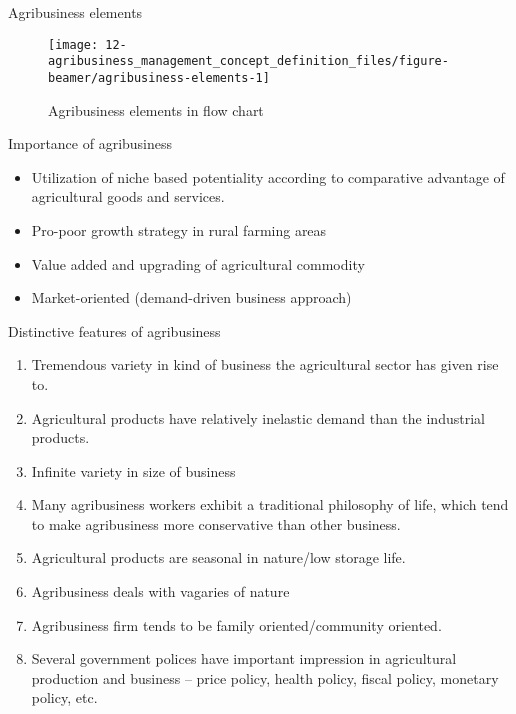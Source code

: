 \documentclass[12pt,ignorenonframetext,aspectratio=169]{beamer}
\providecommand{\tightlist}{%
  \setlength{\itemsep}{0pt}\setlength{\parskip}{0pt}}
\begin{document}
\begin{frame}{Agribusiness elements}
\protect\hypertarget{agribusiness-elements}{}
\begin{figure}
\texttt{[image: 12-agribusiness\_management\_concept\_definition\_files/figure-beamer/agribusiness-elements-1]} \caption{Agribusiness elements in flow chart}\label{fig:agribusiness-elements}
\end{figure}
\end{frame}

\begin{frame}{Importance of agribusiness}
\protect\hypertarget{importance-of-agribusiness}{}
\begin{itemize}
\tightlist
\item
  Utilization of niche based potentiality according to comparative
  advantage of agricultural goods and services.
\item
  Pro-poor growth strategy in rural farming areas
\item
  Value added and upgrading of agricultural commodity
\item
  Market-oriented (demand-driven business approach)
\end{itemize}
\end{frame}

\begin{frame}{Distinctive features of agribusiness}
\protect\hypertarget{distinctive-features-of-agribusiness}{}
\begin{enumerate}
\tightlist
\item
  Tremendous variety in kind of business the agricultural sector has
  given rise to.
\item
  Agricultural products have relatively inelastic demand than the
  industrial products.
\item
  Infinite variety in size of business
\item
  Many agribusiness workers exhibit a traditional philosophy of life,
  which tend to make agribusiness more conservative than other business.
\item
  Agricultural products are seasonal in nature/low storage life.
\item
  Agribusiness deals with vagaries of nature
\item
  Agribusiness firm tends to be family oriented/community oriented.
\item
  Several government polices have important impression in agricultural
  production and business -- price policy, health policy, fiscal policy,
  monetary policy, etc.
\end{enumerate}
\end{frame}
\end{document}
